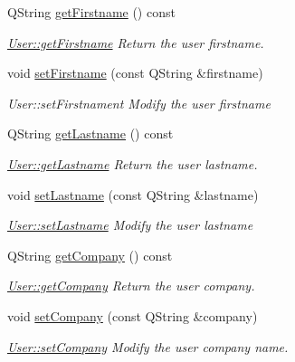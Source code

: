 \begin{DoxyCompactItemize}
\item 
Q\-String \hyperlink{classModels_1_1User_a409a0a6becdd16b9a34120511526ab4d}{get\-Firstname} () const 
\begin{DoxyCompactList}\small\item\em \hyperlink{classModels_1_1User_a409a0a6becdd16b9a34120511526ab4d}{User\-::get\-Firstname} Return the user firstname. \end{DoxyCompactList}\item 
void \hyperlink{classModels_1_1User_a9fdff0463dc3653dd3c3bb7b60bf6c98}{set\-Firstname} (const Q\-String \&firstname)
\begin{DoxyCompactList}\small\item\em User\-::set\-Firstnament Modify the user {\itshape firstname} \end{DoxyCompactList}\item 
Q\-String \hyperlink{classModels_1_1User_acd71c39455f4289dac70fe3688b956a6}{get\-Lastname} () const 
\begin{DoxyCompactList}\small\item\em \hyperlink{classModels_1_1User_acd71c39455f4289dac70fe3688b956a6}{User\-::get\-Lastname} Return the user lastname. \end{DoxyCompactList}\item 
void \hyperlink{classModels_1_1User_a3537478a5fe9e2bcb74cd7e267ca1a5f}{set\-Lastname} (const Q\-String \&lastname)
\begin{DoxyCompactList}\small\item\em \hyperlink{classModels_1_1User_a3537478a5fe9e2bcb74cd7e267ca1a5f}{User\-::set\-Lastname} Modify the user {\itshape lastname} \end{DoxyCompactList}\item 
Q\-String \hyperlink{classModels_1_1User_a5c2a1436bfaaf39df26d1ff45196ff43}{get\-Company} () const 
\begin{DoxyCompactList}\small\item\em \hyperlink{classModels_1_1User_a5c2a1436bfaaf39df26d1ff45196ff43}{User\-::get\-Company} Return the user company. \end{DoxyCompactList}\item 
void \hyperlink{classModels_1_1User_ab51a6e7ea016ad3c7d18c754582edd53}{set\-Company} (const Q\-String \&company)
\begin{DoxyCompactList}\small\item\em \hyperlink{classModels_1_1User_ab51a6e7ea016ad3c7d18c754582edd53}{User\-::set\-Company} Modify the user {\itshape company} name. \end{DoxyCompactList}\item 

\end{DoxyCompactItemize}

